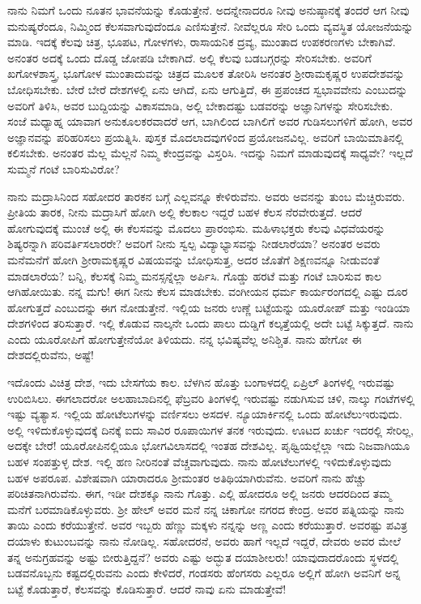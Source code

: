 ನಾನು ನಿಮಗೆ ಒಂದು ನೂತನ ಭಾವನೆಯನ್ನು ಕೊಡುತ್ತೇನೆ. ಅದನ್ನೇನಾದರೂ ನೀವು ಅನುಷ್ಠಾನಕ್ಕೆ ತಂದರೆ ಆಗ ನೀವು ಮನುಷ್ಯರೆಂದೂ, ನಿಮ್ಮಿಂದ ಕೆಲಸವಾಗುವುದೆಂದೂ ಎಣಿಸುತ್ತೇನೆ. ನೀವೆಲ್ಲರೂ ಸೇರಿ ಒಂದು ವ್ಯವಸ್ಥಿತ ಯೋಜನೆಯನ್ನು ಮಾಡಿ. ಇದಕ್ಕೆ ಕೆಲವು ಚಿತ್ರ, ಭೂಪಟ, ಗೋಳಗಳು, ರಾಸಾಯನಿಕ ದ್ರವ್ಯ, ಮುಂತಾದ ಉಪಕರಣಗಳು ಬೇಕಾಗಿವೆ. ಅನಂತರ ಅದಕ್ಕೆ ಒಂದು ದೊಡ್ಡ ಜೋಪಡಿ ಬೇಕಾಗಿದೆ. ಅಲ್ಲಿ ಕೆಲವು ಬಡಬಗ್ಗರನ್ನು ಸೇರಿಸಬೇಕು. ಅವರಿಗೆ ಖಗೋಳಶಾಸ್ತ್ರ, ಭೂಗೋಳ ಮುಂತಾದುವನ್ನು ಚಿತ್ರದ ಮೂಲಕ ತೋರಿಸಿ ಅನಂತರ ಶ‍್ರೀರಾಮಕೃಷ್ಣರ ಉಪದೇಶವನ್ನು ಬೋಧಿಸಬೇಕು. ಬೇರೆ ಬೇರೆ ದೇಶಗಳಲ್ಲಿ ಏನು ಆಗಿದೆ, ಏನು ಆಗುತ್ತಿದೆ, ಈ ಪ್ರಪಂಚದ ಸ್ವಭಾವವೇನು ಎಂಬುದನ್ನು ಅವರಿಗೆ ತಿಳಿಸಿ, ಅವರ ಬುದ್ದಿಯನ್ನು ವಿಕಾಸಮಾಡಿ, ಅಲ್ಲಿ ಬೇಕಾದಷ್ಟು ಬಡವರನ್ನು ಅಜ್ಞಾನಿಗಳನ್ನು ಸೇರಿಸಬೇಕು. ಸಂಜೆ ಮಧ್ಯಾಹ್ನ ಯಾವಾಗ ಅನುಕೂಲಕರವಾದರೆ ಆಗ, ಬಾಗಿಲಿಂದ ಬಾಗಿಲಿಗೆ ಅವರ ಗುಡಿಸಲುಗಳಿಗೆ ಹೋಗಿ, ಅವರ ಅಜ್ಞಾನವನ್ನು ಪರಿಹರಿಸಲು ಪ್ರಯತ್ನಿಸಿ. ಪುಸ್ತಕ ಮೊದಲಾದವುಗಳಿಂದ ಪ್ರಯೋಜನವಿಲ್ಲ. ಅವರಿಗೆ ಬಾಯಿಮಾತಿನಲ್ಲಿ ಕಲಿಸಬೇಕು. ಅನಂತರ ಮೆಲ್ಲ ಮೆಲ್ಲನೆ ನಿಮ್ಮ ಕೇಂದ್ರವನ್ನು ವಿಸ್ತರಿಸಿ. ಇದನ್ನು ನಿಮಗೆ ಮಾಡುವುದಕ್ಕೆ ಸಾಧ್ಯವೇ? ಇಲ್ಲದೆ ಸುಮ್ಮನೆ ಗಂಟೆ ಬಾರಿಸುವಿರೋ?

ನಾನು ಮದ್ರಾಸಿನಿಂದ ಸಹೋದರ ತಾರಕನ ಬಗ್ಗೆ ಎಲ್ಲವನ್ನೂ ಕೇಳಿರುವೆನು. ಅವರು ಅವನನ್ನು ತುಂಬ ಮೆಚ್ಚಿರುವರು. ಪ್ರೀತಿಯ ತಾರಕ, ನೀನು ಮದ್ರಾಸಿಗೆ ಹೋಗಿ ಅಲ್ಲಿ ಕೆಲಕಾಲ ಇದ್ದರೆ ಬಹಳ ಕೆಲಸ ನೆರವೇರುತ್ತದೆ. ಆದರೆ ಹೋಗುವುದಕ್ಕೆ ಮುಂಚೆ ಅಲ್ಲಿ ಈ ಕೆಲಸವನ್ನು ಮೊದಲು ಪ್ರಾರಂಭಿಸು. ಮಹಿಳಾಭಕ್ತರು ಕೆಲವು ವಿಧವೆಯರನ್ನು ಶಿಷ್ಯರನ್ನಾಗಿ ಪರಿವರ್ತಿಸಲಾರರೇ? ಅವರಿಗೆ ನೀನು ಸ್ವಲ್ಪ ವಿದ್ಯಾಭ್ಯಾಸವನ್ನು ನೀಡಲಾರೆಯಾ? ಅನಂತರ ಅವರು ಮನೆಮನೆಗೆ ಹೋಗಿ ಶ‍್ರೀರಾಮಕೃಷ್ಣರ ವಿಷಯವನ್ನು ಬೋಧಿಸುತ್ತ, ಅದರ ಜೊತೆಗೆ ಶಿಕ್ಷಣವನ್ನೂ ನೀಡುವಂತೆ ಮಾಡಲಾರೆಯ? ಬನ್ನಿ, ಕೆಲಸಕ್ಕೆ ನಿಮ್ಮ ಮನಸ್ಸನ್ನೆಲ್ಲಾ ಅರ್ಪಿಸಿ. ಗೊಡ್ಡು ಹರಟೆ ಮತ್ತು ಗಂಟೆ ಬಾರಿಸುವ ಕಾಲ ಆಗಿಹೋಯಿತು. ನನ್ನ ಮಗು! ಈಗ ನೀನು ಕೆಲಸ ಮಾಡಬೇಕು. ವಂಗೀಯನ ಧರ್ಮ ಕಾರ್ಯರಂಗದಲ್ಲಿ ಎಷ್ಟು ದೂರ ಹೋಗುತ್ತದೆ ಎಂಬುದನ್ನು ಈಗ ನೋಡುತ್ತೇನೆ. ಇಲ್ಲಿಯ ಜನರು ಉಣ್ಣೆ ಬಟ್ಟೆಯನ್ನು ಯೂರೋಪ್ ಮತ್ತು ಇಂಡಿಯಾ ದೇಶಗಳಿಂದ ತರಿಸುತ್ತಾರೆ. ಇಲ್ಲಿ ಕೊಡುವ ನಾಲ್ಕನೇ ಒಂದು ಪಾಲು ದುಡ್ಡಿಗೆ ಕಲ್ಕತ್ತೆಯಲ್ಲಿ ಅದೇ ಬಟ್ಟೆ ಸಿಕ್ಕುತ್ತದೆ. ನಾನು ಎಂದು ಯೂರೋಪಿಗೆ ಹೋಗುತ್ತೇನೆಯೋ ತಿಳಿಯದು. ನನ್ನ ಭವಿಷ್ಯವೆಲ್ಲ ಅನಿಶ್ಚಿತ. ನಾನು ಹೇಗೋ ಈ ದೇಶದಲ್ಲಿರುವೆನು, ಅಷ್ಟೆ!

ಇದೊಂದು ವಿಚಿತ್ರ ದೇಶ, ಇದು ಬೇಸಗೆಯ ಕಾಲ. ಬೆಳಗಿನ ಹೊತ್ತು ಬಂಗಾಳದಲ್ಲಿ ಏಪ್ರಿಲ್ ತಿಂಗಳಲ್ಲಿ ಇರುವಷ್ಟು ಉರಿಬಿಸಿಲು. ಈಗಲಾದರೋ ಅಲಹಾಬಾದಿನಲ್ಲಿ ಫೆಬ್ರವರಿ ತಿಂಗಳಲ್ಲಿ ಇರುವಷ್ಟು ನಡುಗಿಸುವ ಚಳಿ, ನಾಲ್ಕು ಗಂಟೆಗಳಲ್ಲಿ ಇಷ್ಟು ವ್ಯತ್ಯಾಸ. ಇಲ್ಲಿಯ ಹೋಟೆಲುಗಳನ್ನು ವರ್ಣಿಸಲು ಅಸದಳ. ನ್ಯೂಯಾರ್ಕಿನಲ್ಲಿ ಒಂದು ಹೋಟೆಲು\break  ಇರುವುದು. ಅಲ್ಲಿ ಇಳಿದುಕೊಳ್ಳುವುದಕ್ಕೆ ದಿನಕ್ಕೆ ಐದು ಸಾವಿರ ರೂಪಾಯಿಗಳ ತನಕ ಇರುವುದು. ಊಟದ ಖರ್ಚು ಇದರಲ್ಲಿ ಸೇರಿಲ್ಲ, ಅದಕ್ಕೇ ಬೇರೆ! ಯೂರೋಪಿನಲ್ಲಿಯೂ ಭೋಗವಿಲಾಸದಲ್ಲಿ ಇಂತಹ ದೇಶವಿಲ್ಲ. ಪೃಥ್ವಿಯಲ್ಲೆಲ್ಲಾ ಇದು ನಿಜವಾಗಿಯೂ ಬಹಳ ಸಂಪತ್ತುಳ್ಳ ದೇಶ. ಇಲ್ಲಿ ಹಣ ನೀರಿನಂತೆ ವೆಚ್ಚವಾಗುವುದು. ನಾನು ಹೋಟೆಲುಗಳಲ್ಲಿ ಇಳಿದುಕೊಳ್ಳುವುದು ಬಹಳ ಅಪರೂಪ. ವಿಶೇಷವಾಗಿ ಯಾರಾದರೂ ಶ‍್ರೀಮಂತರ ಅತಿಥಿಯಾಗಿರುವೆನು. ಅವರಿಗೆ ನಾನು ಹೆಚ್ಚು ಪರಿಚಿತನಾಗಿರುವೆನು. ಈಗ, ಇಡೀ ದೇಶಕ್ಕೂ ನಾನು ಗೊತ್ತು. ಎಲ್ಲಿ ಹೋದರೂ ಅಲ್ಲಿ ಜನರು ಆದರದಿಂದ ತಮ್ಮ ಮನೆಗೆ ಬರಮಾಡಿಕೊಳ್ಳುವರು. ಶ‍್ರೀ ಹೇಲ್ ಅವರ ಮನೆ ನನ್ನ ಚಿಕಾಗೋ ನಗರದ ಕೇಂದ್ರ. ಅವರ ಪತ್ನಿಯನ್ನು ನಾನು ತಾಯಿ ಎಂದು ಕರೆಯುತ್ತೇನೆ. ಅವರ ಇಬ್ಬರು ಹೆಣ್ಣು ಮಕ್ಕಳು ನನ್ನನ್ನು ಅಣ್ಣ ಎಂದು ಕರೆಯುತ್ತಾರೆ. ಅವರಷ್ಟು ಪವಿತ್ರ ದಯಾಳು ಕುಟುಂಬವನ್ನು ನಾನು ನೋಡಿಲ್ಲ. ಸಹೋದರನೆ, ಅವರು ಹಾಗೆ ಇಲ್ಲದೆ ಇದ್ದರೆ, ದೇವರು ಅವರ ಮೇಲೆ ತನ್ನ ಅನುಗ್ರಹವನ್ನು ಅಷ್ಟು ಬೀರುತ್ತಿದ್ದನೆ? ಅವರು ಎಷ್ಟು ಅದ್ಭುತ ದಯಾಶೀಲರು! ಯಾವುದಾದರೊಂದು ಸ್ಥಳದಲ್ಲಿ ಬಡವನೊಬ್ಬನು ಕಷ್ಟದಲ್ಲಿರುವನು ಎಂದು ಕೇಳಿದರೆ, ಗಂಡಸರು ಹೆಂಗಸರು ಎಲ್ಲರೂ ಅಲ್ಲಿಗೆ ಹೋಗಿ ಅವನಿಗೆ ಅನ್ನ ಬಟ್ಟೆ ಕೊಡುತ್ತಾರೆ, ಕೆಲಸವನ್ನು ಕೊಡಿಸುತ್ತಾರೆ. ಆದರೆ ನಾವು ಏನು ಮಾಡುತ್ತೇವೆ!

